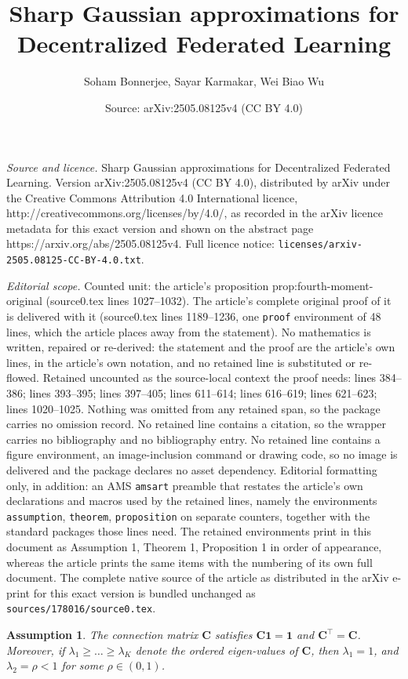 \documentclass[10pt,a4paper]{amsart}
\title{Sharp Gaussian approximations for Decentralized Federated Learning}
\author{Soham Bonnerjee, Sayar Karmakar, Wei Biao Wu}
\date{Source: arXiv:2505.08125v4 (CC BY 4.0)}
\newtheorem{assumption}{Assumption}
\def\bC{\mathbf{C}}
\begin{document}
\maketitle

\noindent\emph{Source and licence.} Sharp Gaussian approximations for Decentralized Federated Learning. Version arXiv:2505.08125v4 (CC BY 4.0), distributed by arXiv under the Creative Commons Attribution 4.0 International licence, http://creativecommons.org/licenses/by/4.0/, as recorded in the arXiv licence metadata for this exact version and shown on the abstract page https://arxiv.org/abs/2505.08125v4. Full licence notice: \texttt{licenses/arxiv-2505.08125-CC-BY-4.0.txt}.\par\smallskip

\noindent\textit{Editorial scope.} Counted unit: the article's proposition prop:fourth-moment-original (source0.tex lines 1027--1032). The article's complete original proof of it is delivered with it (source0.tex lines 1189--1236, one \texttt{proof} environment of 48 lines, which the article places away from the statement). No mathematics is written, repaired or re-derived: the statement and the proof are the article's own lines, in the article's own notation, and no retained line is substituted or re-flowed.  Retained uncounted as the source-local context the proof needs: lines 384--386; lines 393--395; lines 397--405; lines 611--614; lines 616--619; lines 621--623; lines 1020--1025.  Nothing was omitted from any retained span, so the package carries no omission record.  No retained line contains a citation, so the wrapper carries no bibliography and no bibliography entry.  No retained line contains a figure environment, an image-inclusion command or drawing code, so no image is delivered and the package declares no asset dependency.  Editorial formatting only, in addition: an AMS \texttt{amsart} preamble that restates the article's own declarations and macros used by the retained lines, namely the environments \texttt{assumption}, \texttt{theorem}, \texttt{proposition} on separate counters, together with the standard packages those lines need.  The retained environments print in this document as Assumption 1, Theorem 1, Proposition 1 in order of appearance, whereas the article prints the same items with the numbering of its own full document.  The complete native source of the article as distributed in the arXiv e-print for this exact version is bundled unchanged as \texttt{sources/178016/source0.tex}.
\begin{assumption}\label{ass:sync}
    The connection matrix $\bC$ satisfies $\bC \mathbf{1}=\mathbf{1}$ and $\bC^\top=\bC$. Moreover, if $\lambda_1\geq \ldots \geq \lambda_K$ denote the ordered eigen-values of $\bC$, then $\lambda_1=1$, and $\lambda_2 = \rho <1$ for some $\rho \in (0,1)$.
\end{assumption}
\end{document}
